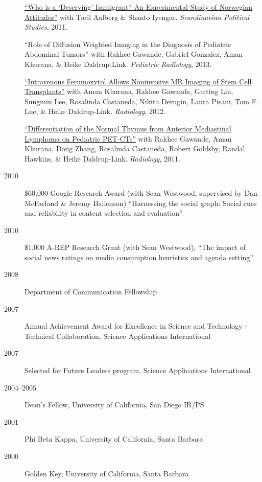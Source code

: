 \documentclass[letterpaper,11pt]{article}
\newcommand{\resheading}[1]{\vspace{4pt}{\large
\colorbox{mygrey}{\begin{minipage}{\textwidth}{\textbf{#1
\vphantom{p\^{E}}}}\end{minipage}}}\vspace{4pt}}
\begin{document}
\begin{description}
\item[] \href{http://onlinelibrary.wiley.com/doi/10.1111/j.1467-9477.2011.00280.x/abstract}{``Who is a `Deserving' Immigrant? An Experimental Study of Norwegian Attitudes''} with Toril Aalberg \& Shanto Iyengar.  \emph{Scandinavian Political Studies}, 2011.

\item[] {``Role of Diffusion Weighted Imaging in the Diagnosis of Pediatric Abdominal Tumors''} with Rakhee Gawande, Gabriel Gonzalez, Aman Khurana, \& Heike Daldrup-Link.  \emph{Pediatric Radiology}, 2013.

\item[] \href{http://radiology.rsna.org/content/264/3/803.full.pdf+html}{``Intravenous Ferumoxytol Allows Noninvasive MR Imaging of Stem Cell Transplants''} with Aman Khurana, Rakhee Gawande, Guiting Lin, Sungmin Lee, Rosalinda Castaneda, Nikita Derugin, Laura Pisani, Tom F. Lue, \& Heike Daldrup-Link.  \emph{Radiology}, 2012.

\item[] \href{http://radiology.rsna.org/content/early/2011/12/11/radiol.11110715.long}{``Differentiation of the Normal Thymus from Anterior Mediastinal Lymphoma on Pediatric PET-CTs''} with Rakhee Gawande, Aman Khurana, Dong Zhang, Rosalinda Castaneda, Robert Goldsby, Randal Hawkins, \& Heike Daldrup-Link.  \emph{Radiology}, 2011.

\end{description}

\resheading{Honors and Awards}
\begin{description}
\item[2010] \$60,000 Google Research Award (with Sean Westwood, supervised by Dan McFarland \& Jeremy Bailenson) ``Harnessing the social graph: Social cues and reliability in content selection and evaluation''
\item[2010] \$1,000 A-REP Research Grant (with Sean Westwood), ``The impact of social news ratings on media consumption heuristics and agenda setting''
\item[2008] Department of Communication Fellowship
\item[2007] Annual Achievement Award for Excellence in Science and Technology - Technical Collaboration, Science Applications International
\item[2007] Selected for Future Leaders program, Science Applications International
\item[2004--2005] Dean's Fellow, University of California, San Diego IR/PS 
\item[2001] Phi Beta Kappa, University of California, Santa Barbara
\item[2000] Golden Key, University of California, Santa Barbara
\end{description}
\end{document}
